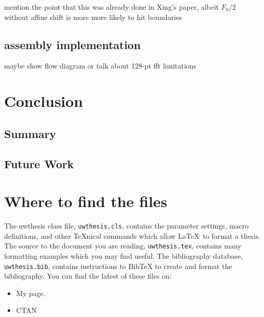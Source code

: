 \documentclass [11pt, proquest] {uwthesis}[2015/03/03]
\begin{document}
mention the point that this was already done in Xing's paper, albeit $F_0/2$ without affine shift is more more likely to hit boundaries 

\section{assembly implementation}

maybe show flow diagram or talk about 128-pt fft limitations




\chapter{Conclusion}

\section{Summary}

\section{Future Work}



%
%
\nocite{*}   %


%
%
\appendix
\raggedbottom\sloppy
 
 
\chapter{Where to find the files}
 
The uwthesis class file, {\tt uwthesis.cls}, contains the parameter settings,
macro definitions, and other \TeX nical commands which
allow \LaTeX\ to format a thesis.  
The source to
the document you are reading, {\tt uwthesis.tex},
contains many formatting examples
which you may find useful.
The bibliography database, {\tt uwthesis.bib}, contains instructions
to BibTeX to create and format the bibliography.
You can find the latest of these files on:

\begin{itemize}
\item My page.
\begin{description}
\item[] \verb%http://staff.washington.edu/fox/tex/uwthesis.html%
\end{description}

\item CTAN

\end{itemize}

\end{document}
